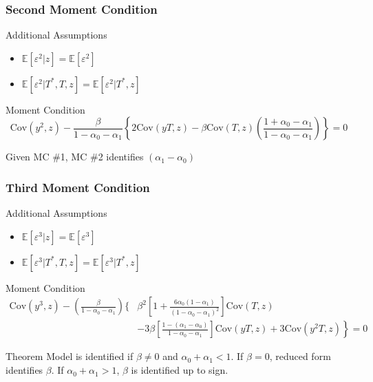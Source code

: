 \documentclass{beamer}
\begin{document}
\begin{frame}
  \frametitle{Second Moment Condition}
  \begin{block}{Additional Assumptions}
    \begin{itemize}
      \item $\mathbb{E}[\varepsilon^2|z]=\mathbb{E}[\varepsilon^2]$
      \item $\mathbb{E}[\varepsilon^2|T^*,T,z] =  \mathbb{E}[\varepsilon^2|T^*,z]$
    \end{itemize}
  \end{block}

  \begin{block}{Moment Condition}
    \small
  \[\mbox{Cov}(y^2,z) - \frac{\beta}{1 - \alpha_0 - \alpha_1}\left\{2\mbox{Cov}(yT,z)- \beta \mbox{Cov}(T,z)\left( \frac{1 + \alpha_0 - \alpha_1}{1 - \alpha_0 - \alpha_1} \right)  \right\} = 0\]
  \end{block}

  \alert{Given MC \#1, MC \#2 identifies $(\alpha_1 - \alpha_0)$}
\end{frame}
\begin{frame}
  \frametitle{Third Moment Condition}
  \begin{block}{Additional Assumptions}
    \begin{itemize}
      \item $\mathbb{E}[\varepsilon^3|z]=\mathbb{E}[\varepsilon^3]$
      \item $\mathbb{E}[\varepsilon^3|T^*,T,z] =  \mathbb{E}[\varepsilon^3|T^*,z]$
    \end{itemize}
  \end{block}
  \begin{block}{Moment Condition}
\scriptsize
\begin{align*}
  \mbox{Cov}(y^3,z) - \left( \frac{\beta}{1 - \alpha_0 - \alpha_1} \right)\Bigg \{& \left. \beta^2\left[1 + \frac{6\alpha_0(1 - \alpha_1)}{(1 - \alpha_0 - \alpha_1)^2} \right] \mbox{Cov}(T,z)\right.\\ & \left. - 3\beta\left[ \frac{1 - (\alpha_1 - \alpha_0)}{1 - \alpha_0 - \alpha_1} \right] \mbox{Cov}(yT,z) + 3\mbox{Cov}(y^2T,z) \right\} = 0
\end{align*}
\end{block}
\normalsize
\begin{alertblock}{Theorem}
  Model is identified if $\beta \neq 0$ and $\alpha_0 + \alpha_1 <1$. If $\beta = 0$, reduced form identifies $\beta$. 
If $\alpha_0 + \alpha_1 >1$, $\beta$ is identified up to sign.
\end{alertblock}
\end{frame}
\end{document}
